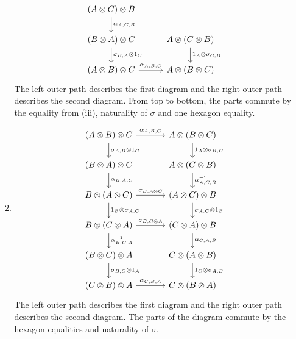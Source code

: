 \begin{answer}
\begin{enumerate}
\begin{enumerate}
\[\begin{tikzcd}[column sep=0.5cm]
        (A \otimes C) \otimes B
          \arrow[d, "\alpha_{A, C, B}"] \\
        (B \otimes A) \otimes C
          \arrow[d, "\sigma_{B, A} \otimes 1_C"] &&
        A \otimes (C \otimes B)
          \arrow[d, "1_A \otimes \sigma_{C, B}"] \\
        (A \otimes B) \otimes C
          \arrow[rr, "\alpha_{A, B, C}"] &&
        A \otimes (B \otimes C)
      \end{tikzcd} \]
      The left outer path describes the first diagram and the right outer path describes the second diagram.
      From top to bottom, the parts commute by the equality from (iii), naturality of $\sigma$ and one hexagon equality.

    \item
      \[ \begin{tikzcd}[column sep=1.2cm]
        (A \otimes B) \otimes C
          \arrow[r, "\alpha_{A, B, C}"]
          \arrow[d, "\sigma_{A, B} \otimes 1_C"] &
        A \otimes (B \otimes C)
          \arrow[d, "1_A \otimes \sigma_{B, C}"] \\
        (B \otimes A) \otimes C
          \arrow[d, "\alpha_{B, A, C}"] &
        A \otimes (C \otimes B)
          \arrow[d, "\alpha_{A, C, B}^{-1}"] \\
        B \otimes (A \otimes C)
          \arrow[r, "\sigma_{B, A \otimes C}"]
          \arrow[d, "1_B \otimes \sigma_{A, C}"] &
        (A \otimes C) \otimes B
          \arrow[d, "\sigma_{A, C} \otimes 1_B"] \\
        B \otimes (C \otimes A)
          \arrow[r, "\sigma_{B, C \otimes A}"]
          \arrow[d, "\alpha_{B, C, A}^{-1}"] &
        (C \otimes A) \otimes B
          \arrow[d, "\alpha_{C, A, B}"] \\
        (B \otimes C) \otimes A
          \arrow[d, "\sigma_{B, C} \otimes 1_A"] &
        C \otimes (A \otimes B)
          \arrow[d, "1_C \otimes \sigma_{A, B}"] \\
        (C \otimes B) \otimes A
          \arrow[r, "\alpha_{C, B, A}"] &
        C \otimes (B \otimes A)
      \end{tikzcd} \]
      The left outer path describes the first diagram and the right outer path describes the second diagram.
      The parts of the diagram commute by the hexagon equalities and naturality of $\sigma$.


\end{enumerate}
\end{enumerate}
\end{answer}
